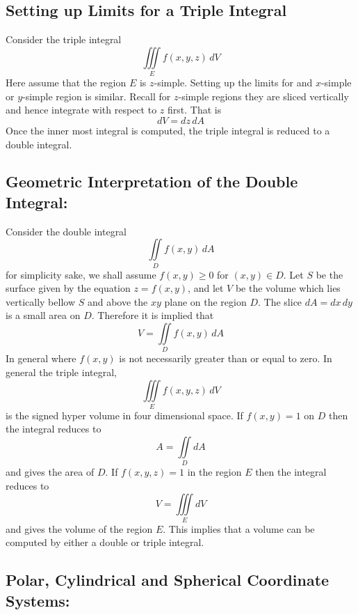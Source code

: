 \documentclass[14pt]{article}
\begin{document}
    \subsection{Setting up Limits for a Triple Integral}
    Consider the triple integral
    $$\iiint \limits_E f(x,y,z)\, dV$$ Here assume that the region $E$
    is $z$-simple. Setting up the limits for and $x$-simple or
    $y$-simple region is similar. Recall for $z$-simple regions they are
    sliced vertically and hence integrate with respect to $z$ first.
    That is
    $$dV=dz\, dA$$ Once the inner most integral is computed, the triple
    integral is reduced to a double integral.
    \subsection{Geometric Interpretation of the Double Integral:}
    Consider the double integral
    $$\iint\limits_D f(x,y)\, dA$$ for simplicity sake, we shall assume
    $f(x,y)\geq 0$ for $(x,y)\in D$. Let $S$ be the surface given by the
    equation $z=f(x,y)$, and let $V$ be the volume which lies vertically
    bellow $S$ and above the $xy$ plane on the region $D$. The slice
    $dA=dx\, dy$ is a small area on $D$. Therefore it is implied that
    $$V=\iint\limits_Df(x,y)\, dA$$ In general where $f(x,y)$ is not
    necessarily greater than or equal to zero. In general the triple
    integral, 
    $$\iiint\limits_Ef(x,y,z)\, dV$$ is the signed hyper volume in four
    dimensional space. If $f(x,y)=1$ on $D$ then the integral reduces to
    $$A=\iint\limits_D dA$$ and gives the area of $D$. If $f(x,y,z)=1$
    in the region $E$ then the integral reduces to
    $$V=\iiint\limits_EdV$$ and gives the volume of the region $E$. This
    implies that a volume can be computed by either a double or triple
    integral.
    \subsection{Polar, Cylindrical and Spherical Coordinate Systems:}
\end{document}
